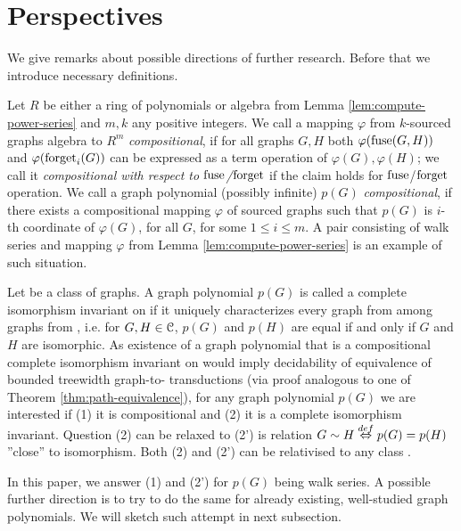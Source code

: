 
\section{Perspectives}
We give remarks about possible directions of further research. Before that we introduce necessary definitions.

Let $R$ be either a ring of polynomials or algebra \aalg from Lemma \ref{lem:compute-power-series} and $m, k$ any positive integers. We call a mapping $\varphi$ from $k$-sourced graphs algebra to $R^m$ \emph{compositional}, if for all graphs $G, H$ both $\varphi(\operatorname{fuse}(G, H))$ and $\varphi(\operatorname{forget}_i(G))$ can be expressed as a term operation of $\varphi(G), \varphi(H)$; we call it \emph{compositional with respect to $\operatorname{fuse}$/$\operatorname{forget}$} if the claim holds for $\operatorname{fuse}$/$\operatorname{forget}$ operation. We call a graph polynomial (possibly infinite) $p(G)$ \emph{compositional}, if there exists a compositional mapping $\varphi$ of sourced graphs such that $p(G)$ is $i$-th coordinate of $\varphi(G)$, for all $G$, for some $1\leq i\leq m$. A pair consisting of walk series and mapping $\varphi$ from Lemma \ref{lem:compute-power-series} is an example of such situation.

Let \Cc be a class of graphs. A graph polynomial $p(G)$ is called a complete isomorphism invariant on \Cc if it uniquely characterizes every graph from \Cc {} among graphs from \Cc, i.e. for $G,H\in \mathcal{C}$, $p(G)$ and $p(H)$ are equal if and only if $G$ and $H$ are isomorphic. %
As existence of a graph polynomial that is a compositional complete isomorphism invariant on \Cc would imply decidability of equivalence of bounded treewidth graph-to-\Cc {} \mso transductions (via proof analogous to one of Theorem \ref{thm:path-equivalence}), for any graph polynomial $p(G)$ we are interested if (1) it is compositional and (2) it is a complete isomorphism invariant. Question (2) can be relaxed to (2') is relation $G \sim H \stackrel{def}{\Leftrightarrow} p(G) = p(H)$ ''close'' to isomorphism. Both (2) and (2') can be relativised to any class \Cc.

In this paper, we answer (1) and (2') for $p(G)$ being walk series. A possible further direction is to try to do the same for already existing, well-studied graph polynomials. We will sketch such attempt in next subsection. 
